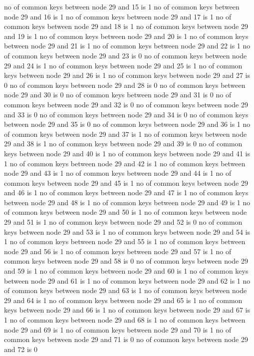 no of common keys between node 29 and 15 is 1
no of common keys between node 29 and 16 is 1
no of common keys between node 29 and 17 is 1
no of common keys between node 29 and 18 is 1
no of common keys between node 29 and 19 is 1
no of common keys between node 29 and 20 is 1
no of common keys between node 29 and 21 is 1
no of common keys between node 29 and 22 is 1
no of common keys between node 29 and 23 is 0
no of common keys between node 29 and 24 is 1
no of common keys between node 29 and 25 is 1
no of common keys between node 29 and 26 is 1
no of common keys between node 29 and 27 is 0
no of common keys between node 29 and 28 is 0
no of common keys between node 29 and 30 is 0
no of common keys between node 29 and 31 is 0
no of common keys between node 29 and 32 is 0
no of common keys between node 29 and 33 is 0
no of common keys between node 29 and 34 is 0
no of common keys between node 29 and 35 is 0
no of common keys between node 29 and 36 is 1
no of common keys between node 29 and 37 is 1
no of common keys between node 29 and 38 is 1
no of common keys between node 29 and 39 is 0
no of common keys between node 29 and 40 is 1
no of common keys between node 29 and 41 is 1
no of common keys between node 29 and 42 is 1
no of common keys between node 29 and 43 is 1
no of common keys between node 29 and 44 is 1
no of common keys between node 29 and 45 is 1
no of common keys between node 29 and 46 is 1
no of common keys between node 29 and 47 is 1
no of common keys between node 29 and 48 is 1
no of common keys between node 29 and 49 is 1
no of common keys between node 29 and 50 is 1
no of common keys between node 29 and 51 is 1
no of common keys between node 29 and 52 is 0
no of common keys between node 29 and 53 is 1
no of common keys between node 29 and 54 is 1
no of common keys between node 29 and 55 is 1
no of common keys between node 29 and 56 is 1
no of common keys between node 29 and 57 is 1
no of common keys between node 29 and 58 is 0
no of common keys between node 29 and 59 is 1
no of common keys between node 29 and 60 is 1
no of common keys between node 29 and 61 is 1
no of common keys between node 29 and 62 is 1
no of common keys between node 29 and 63 is 1
no of common keys between node 29 and 64 is 1
no of common keys between node 29 and 65 is 1
no of common keys between node 29 and 66 is 1
no of common keys between node 29 and 67 is 1
no of common keys between node 29 and 68 is 1
no of common keys between node 29 and 69 is 1
no of common keys between node 29 and 70 is 1
no of common keys between node 29 and 71 is 0
no of common keys between node 29 and 72 is 0
